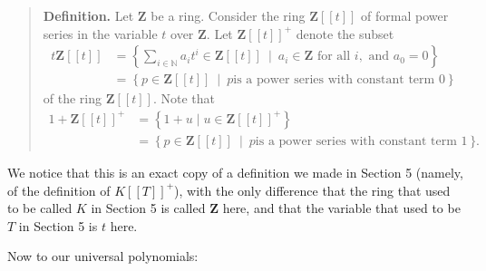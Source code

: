 \documentclass[numbers=enddot,12pt,final,onecolumn,notitlepage]{scrartcl}%
\begin{document}
\begin{quote}
\textbf{Definition.} Let $\mathbf{Z}$ be a ring. Consider the ring
$\mathbf{Z}\left[  \left[  t\right]  \right]  $ of formal power series in the
variable $t$ over $\mathbf{Z}$. Let $\mathbf{Z}\left[  \left[  t\right]
\right]  ^{+}$ denote the subset%
\begin{align*}
t\mathbf{Z}\left[  \left[  t\right]  \right]   &  =\left\{  \sum
_{i\in\mathbb{N}}a_{i}t^{i}\in\mathbf{Z}\left[  \left[  t\right]  \right]
\ \mid\ a_{i}\in\mathbf{Z}\text{ for all }i,\text{ and }a_{0}=0\right\} \\
&  =\left\{  p\in\mathbf{Z}\left[  \left[  t\right]  \right]  \ \mid\ p\text{
is a power series with constant term }0\right\}
\end{align*}
of the ring $\mathbf{Z}\left[  \left[  t\right]  \right]  $. Note that
\begin{align*}
1+\mathbf{Z}\left[  \left[  t\right]  \right]  ^{+}  &  =\left\{  1+u\mid
u\in\mathbf{Z}\left[  \left[  t\right]  \right]  ^{+}\right\} \\
&  =\left\{  p\in\mathbf{Z}\left[  \left[  t\right]  \right]  \ \mid\ p\text{
is a power series with constant term }1\right\}  .
\end{align*}



\end{quote}

We notice that this is an exact copy of a definition we made in Section 5
(namely, of the definition of $K\left[  \left[  T\right]  \right]  ^{+}$),
with the only difference that the ring that used to be called $K$ in Section 5
is called $\mathbf{Z}$ here, and that the variable that used to be $T$ in
Section 5 is $t$ here.

Now to our universal polynomials:
\end{document}
